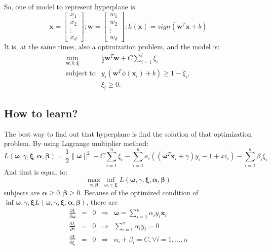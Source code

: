 \documentclass{article}
\begin{document}
So, one of model to represent hyperplane is:
$$
\mathbf{x} = \left[\begin{array}{c} x_1 \\ x_2 \\ \vdots \\ x_d \end{array}\right];
\mathbf{w} = \left[\begin{array}{c} w_1 \\ w_2 \\ \vdots \\ w_d \end{array}\right];
h(\mathbf{x}) = sign\left(\mathbf{w}^T\mathbf{x}+b\right)
$$
It is, at the same times, also a optimization problem, and the model\cite{svm1} is:
\begin{equation}
\label{eq:hyp:op}
\begin{array}{rl}
  \min\limits_{\mathbf{w},b,\mathbf{\xi}} & \frac{1}{2}\mathbf{w}^T\mathbf{w}+C\sum\limits_{i=1}^{l}\xi_i\\
  \text{subject to} & y_i\left(\mathbf{w}^T\phi(\mathbf{x}_i)+b\right) \geq 1 - \xi_i,\\
                                          & \xi_i \geq 0.
\end{array}
\end{equation}

\subsection{How to learn?}
\label{sec:svm:how}

The best way to find out that hyperplane is find the solution of that optimization problem.
By using Lagrange multiplier method\cite{GraphML1}:
\begin{equation}
  \label{eq:lagrange-multiplier-method}
  L(\mathbf{\omega},\gamma,\mathbf{\xi},\mathbf{\alpha},\mathbf{\beta}) =
  \frac{1}{2}\parallel\mathbf{\omega}\parallel^2+C\sum\limits_{i=1}^{n}\xi_i
  - \sum\limits_{i=1}^{n}a_i\left(\left(\mathbf{\omega}^T\mathbf{x}_i+\gamma\right)y_i-1+
  xi_i\right) - \sum\limits_{i=1}^{n}\beta_i\xi_i
\end{equation}
And that is equal to:
\begin{equation}
\max\limits_{\mathbf{\alpha},\mathbf{\beta}}\inf\limits_{\mathbf{\omega},\gamma,\mathbf{\xi}}
 L(\mathbf{\omega},\gamma,\mathbf{\xi},\mathbf{\alpha},\mathbf{\beta})
\end{equation}
subjects are $\mathbf{\alpha} \geq 0,\mathbf{\beta} \geq 0$.
Because of the optimized condition of $\inf{\mathbf{\omega},\gamma,\mathbf{\xi}}
L(\mathbf{\omega},\gamma,\mathbf{\xi},\mathbf{\alpha},\mathbf{\beta})$,
there are
$$\begin{array}{ccccl}
\frac{\partial L}{\partial \mathbf{\omega}} & = & 0 & \Rightarrow & \mathbf{\omega} = \sum\limits_{i=1}^{n}\alpha_iy_i\mathbf{x}_i \\
\frac{\partial L}{\partial \gamma} & = & 0 & \Rightarrow & \sum\limits_{i=1}^{n}\alpha_iy_i = 0 \\
\frac{\partial L}{\partial \xi_i} & = & 0 & \Rightarrow & \alpha_i + \beta_i = C, \forall i=1,\dots,n
\end{array}
$$
\end{document}
